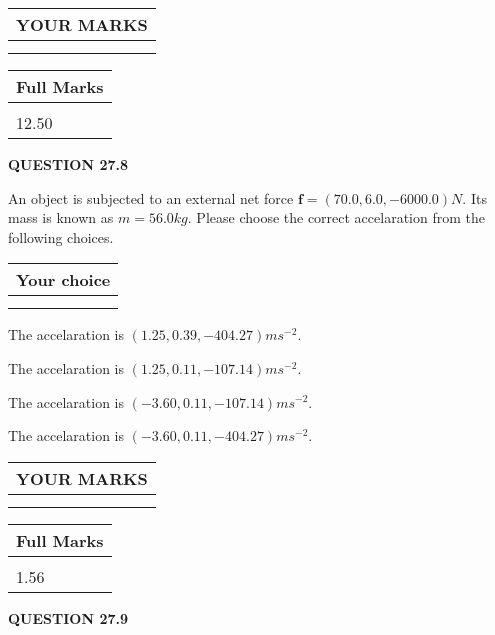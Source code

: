 \documentclass[12pt]{article}
\begin{document}
 

 
\vspace{0.3in}
  
\vspace{0.2in}
  
\noindent\begin{tabular}{|l|}
\hline
 YOUR MARKS  \\
\hline
 \\ 
 \\ 
\hline
\end{tabular}
\hspace{0.05in} \begin{tabular}{|l|}
\hline
 Full Marks  \\
\hline
 \\ 
12.50 \\
\hline
\end{tabular}
{\textbf{\Large{QUESTION
27.8 
}}}
  
  
 
An object is subjected to an external net force $\mathbf{f}=
(70.0 , 6.0 , -6000.0) N$.
Its mass is known as $m= %
56.0 kg$.
Please choose the correct accelaration from the following choices.
  
  
\noindent\hspace{3.0in} \begin{tabular}{|l|}
\hline
Your choice \\
\hline
 \\ 
 \\ 
\hline
\end{tabular}
  
  
 
 
  The accelaration is $  %
(
1.25,
0.39,
-404.27)
ms^{-2} $.
 
 
  The accelaration is $  %
(
1.25,
0.11,
-107.14)
ms^{-2} $.
 
 
  The accelaration is $  %
(
-3.60,
0.11,
-107.14)
ms^{-2} $.
 
 
  The accelaration is $  %
(
-3.60,
0.11,
-404.27)
ms^{-2} $.
 
 
 

 
 
\vspace{0.3in}
  
\vspace{0.2in}
  
\noindent\begin{tabular}{|l|}
\hline
 YOUR MARKS  \\
\hline
 \\ 
 \\ 
\hline
\end{tabular}
\hspace{0.05in} \begin{tabular}{|l|}
\hline
 Full Marks  \\
\hline
 \\ 
1.56 \\
\hline
\end{tabular}
{\textbf{\Large{QUESTION
27.9 
}}}
  
\end{document}
